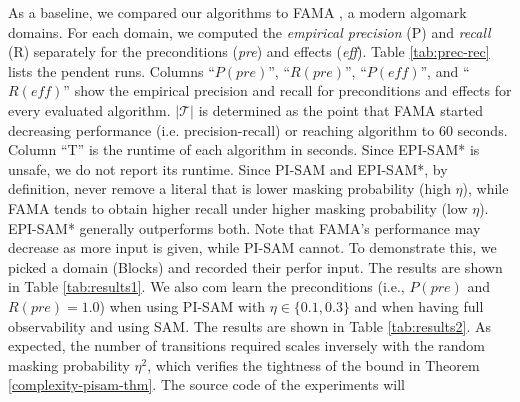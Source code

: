 \documentclass[letterpaper]{article} %
\newcommand{\pre}{\textit{pre}}
\newcommand{\eff}{\textit{eff}}
\begin{document}
As a baseline, we compared our algorithms to FAMA \citep{aineto2019learning}, a modern algomark domains. %
For each domain, we computed the \textit{empirical precision} (P) and \textit{recall} (R) separately for the preconditions (\pre) and effects (\eff).
Table \ref{tab:prec-rec} lists the pendent runs.
Columns ``$P(\pre)$'', ``$R(\pre)$'', ``$P(\eff)$'', and ``$R(\eff)$'' show the empirical precision and recall for preconditions and effects for every evaluated algorithm.
$|\mathcal{T}|$ is determined as the point that FAMA started decreasing performance (i.e. precision-recall) or reaching  algorithm to 60 seconds. Column ``T'' is the runtime of each algorithm in seconds. %
Since EPI-SAM* is unsafe, we do not report its runtime. %
Since PI-SAM and EPI-SAM*, by definition, never remove a literal that is   
 lower masking probability (high $\eta$), while FAMA tends to obtain higher recall under higher masking probability (low $\eta$). EPI-SAM* generally outperforms both.
Note that FAMA's performance may decrease as more input is given, while PI-SAM cannot.
To demonstrate this, we picked a domain (Blocks) and recorded their perfor input. The results are shown in Table \ref{tab:results1}.
We also com learn the preconditions (i.e., $P(\pre)$ and $R(\pre) = 1.0$)
when using PI-SAM with $\eta\in\{0.1, 0.3\}$ and when having full observability and using SAM.
The results are shown in Table \ref{tab:results2}. As expected, the number of transitions required scales inversely with the random masking probability $\eta^2$, which verifies the tightness of the bound in Theorem \ref{complexity-pisam-thm}.
The source code of the experiments will 
\end{document}
